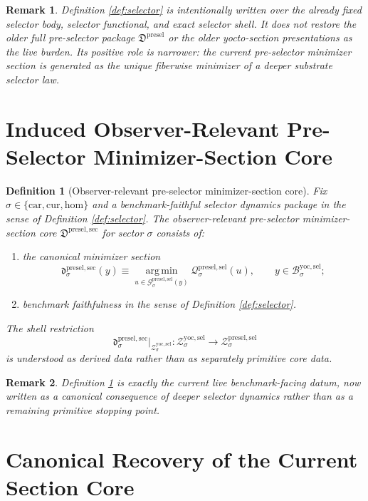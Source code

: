 \documentclass[11pt]{article}
\newcommand{\Car}{\mathrm{car}}
\newcommand{\Cur}{\mathrm{cur}}
\newcommand{\Hom}{\mathrm{hom}}
\newcommand{\YoctoSelectorBody}[1]{\mathcal B_{#1}^{\mathrm{yoc,sel}}}
\newcommand{\YoctoSelectorShell}[1]{\mathcal Z_{#1}^{\mathrm{yoc,sel}}}
\newcommand{\PreSelectorPackage}{\mathfrak D^{\mathrm{presel}}}
\newcommand{\PreSelectorMinSectionCore}{\mathfrak D^{\mathrm{presel,sec}}}
\newcommand{\PreSelectorMinSection}[1]{\mathfrak d_{#1}^{\mathrm{presel,sec}}}
\newcommand{\PreSectionSelectorFiber}[2]{\mathcal G_{#1}^{\mathrm{presel,sel}}(#2)}
\newcommand{\PreSectionSelectorFunctional}[1]{\mathscr Q_{#1}^{\mathrm{presel,sel}}}
\newcommand{\PreSectionSelectorShell}[1]{\mathcal Z_{#1}^{\mathrm{presel,sel}}}
\newtheorem{definition}{Definition}
\newtheorem{remark}{Remark}
\begin{document}
\begin{remark}
Definition \ref{def:selector} is intentionally written over the already fixed selector body, selector functional, and exact selector shell. It does not restore the older full pre-selector package \(\PreSelectorPackage\) or the older yocto-section presentations as the live burden. Its positive role is narrower: the current pre-selector minimizer section is generated as the unique fiberwise minimizer of a deeper substrate selector law.
\end{remark}

\section{Induced Observer-Relevant Pre-Selector Minimizer-Section Core}

\begin{definition}[Observer-relevant pre-selector minimizer-section core]
\label{def:sectioncore}
Fix \(\sigma\in\{\Car,\Cur,\Hom\}\) and a benchmark-faithful selector dynamics package in the sense of Definition \ref{def:selector}. The \emph{observer-relevant pre-selector minimizer-section core} \(\PreSelectorMinSectionCore\) for sector \(\sigma\) consists of:
\begin{enumerate}
    \item the canonical minimizer section
    \[
    \PreSelectorMinSection{\sigma}(y)
    \equiv
    \operatorname*{arg\,min}_{u\in\PreSectionSelectorFiber{\sigma}{y}}
    \PreSectionSelectorFunctional{\sigma}(u),
    \qquad
    y\in\YoctoSelectorBody{\sigma};
    \]
    \item benchmark faithfulness in the sense of Definition \ref{def:selector}.
\end{enumerate}
The shell restriction
\[
\PreSelectorMinSection{\sigma}\big|_{\YoctoSelectorShell{\sigma}}
:
\YoctoSelectorShell{\sigma}\to\PreSectionSelectorShell{\sigma}
\]
is understood as derived data rather than as separately primitive core data.
\end{definition}

\begin{remark}
Definition \ref{def:sectioncore} is exactly the current live benchmark-facing datum, now written as a canonical consequence of deeper selector dynamics rather than as a remaining primitive stopping point.
\end{remark}

\section{Canonical Recovery of the Current Section Core}
\end{document}

